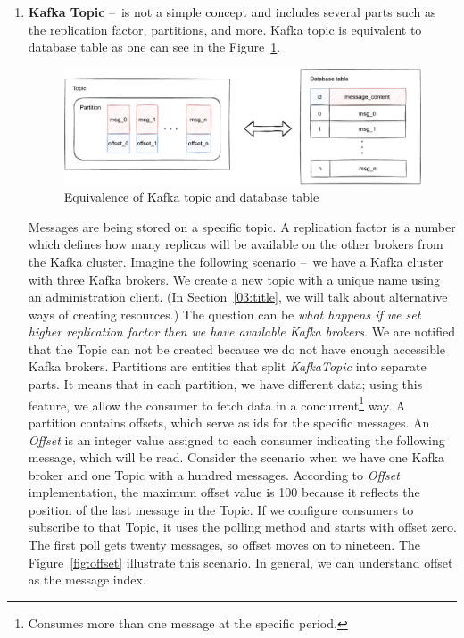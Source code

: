 \begin{enumerate}
    \item \textbf{Kafka Topic} \---\ is not a simple concept and includes several parts such as the replication factor, partitions, and more.
    Kafka topic is equivalent to database table as one can see in the Figure~\ref{fig:topicAndDatabaseTable}.
    \begin{figure}[!ht]
        \centering
        \includegraphics[scale=0.80]{obrazky-figures/02-preliminaries/02-kafka/03-database-relation}
        \caption{Equivalence of Kafka topic and database table}
        \label{fig:topicAndDatabaseTable}
    \end{figure}

    Messages are being stored on a specific topic.
    A replication factor is a number which defines how many replicas will be available on the other brokers from the Kafka cluster.
    Imagine the following scenario \---\ we have a Kafka cluster with three Kafka brokers.
    We create a new topic with a unique name using an administration client. (In Section~\ref{03:title}, we will talk about alternative ways of creating resources.) The question can be \emph{what happens if we set higher replication factor then we have available Kafka brokers}.
    We are notified that the Topic can not be created because we do not have enough accessible Kafka brokers.
    Partitions are entities that split \emph{KafkaTopic} into separate parts.
    It means that in each partition, we have different data; using this feature, we allow the consumer to fetch data in a concurrent\footnote{Consumes more than one message at the specific period.} way.
    A partition contains offsets, which serve as ids for the specific messages.
    An \emph{Offset} is an integer value assigned to each consumer indicating the following message, which will be read.
    Consider the scenario when we have one Kafka broker and one Topic with a hundred messages.
    According to \emph{Offset}  implementation, the maximum offset value is 100 because it reflects the position of the last message in the Topic.
    If we configure consumers to subscribe to that Topic, it uses the polling method and starts with offset zero.
    The first poll gets twenty messages, so offset moves on to nineteen. The Figure~\ref{fig:offset} illustrate this scenario.
    In general, we can understand offset as the message index.


\end{enumerate}
